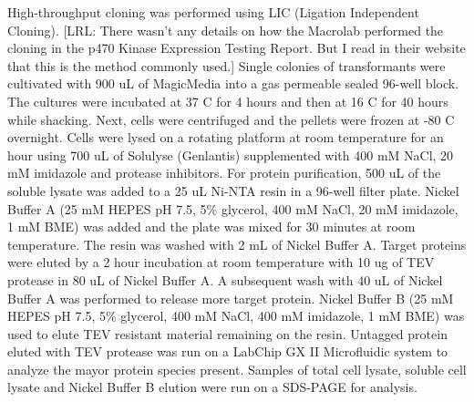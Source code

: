 \documentclass[aps,pre,twocolumn,nofootinbib,superscriptaddress,linenumbers]{revtex4-1}
\begin{document}
High-throughput cloning was performed using LIC (Ligation Independent Cloning). {\color{blue}[LRL: There wasn't any details on how the Macrolab performed the cloning in the p470 Kinase Expression Testing Report. But I read in their website that this is the method commonly used.]}
Single colonies of transformants were cultivated with 900 uL of MagicMedia into a gas permeable sealed 96-well block. 
The cultures were incubated at 37 C for 4 hours and then at 16 C for 40 hours while shacking. 
Next, cells were centrifuged and the pellets were frozen at -80 C overnight. 
Cells were lysed on a rotating platform at room temperature for an hour using 700 uL of Solulyse (Genlantis) supplemented with 400 mM NaCl, 20 mM imidazole and protease inhibitors. 
For protein purification, 500 uL of the soluble lysate was added to a 25 uL Ni-NTA resin in a 96-well filter plate. 
Nickel Buffer A (25 mM HEPES pH 7.5, 5\% glycerol, 400 mM NaCl, 20 mM imidazole, 1 mM BME) was added and the plate was mixed for 30 minutes at room temperature. 
The resin was washed with 2 mL of Nickel Buffer A. 
Target proteins were eluted by a 2 hour incubation at room temperature with 10 ug of TEV protease in 80 uL of Nickel Buffer A.
A subsequent wash with 40 uL of Nickel Buffer A was performed to release more target protein. 
Nickel Buffer B (25 mM HEPES pH 7.5, 5\% glycerol, 400 mM NaCl, 400 mM imidazole, 1 mM BME) was used to elute TEV resistant material remaining on the resin.
Untagged protein eluted with TEV protease was run on a LabChip GX II Microfluidic system to analyze the mayor protein species present. 
Samples of total cell lysate, soluble cell lysate and Nickel Buffer B elution were run on a SDS-PAGE for analysis. 

%  
% 
\end{document}
